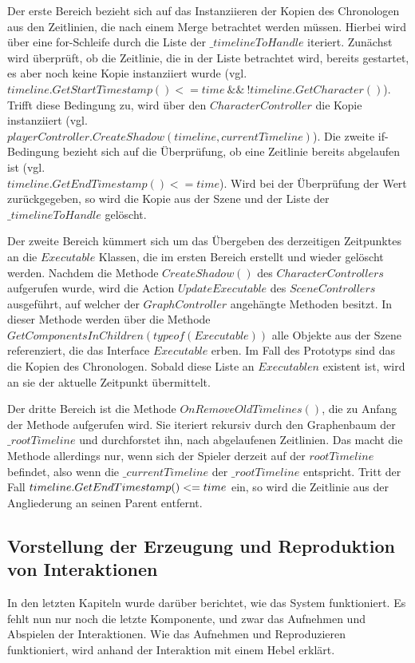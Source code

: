 Der erste Bereich bezieht sich auf das Instanziieren der Kopien des Chronologen aus den Zeitlinien, die nach einem Merge betrachtet werden müssen. Hierbei wird über eine for-Schleife durch die Liste der $\_timelineToHandle$ iteriert.
Zunächst wird überprüft, ob die Zeitlinie, die in der Liste betrachtet wird, bereits gestartet, es aber noch keine Kopie instanziiert wurde (vgl. $timeline.GetStartTimestamp() <= time ~\&\&~ !timeline.GetCharacter()$). Trifft diese Bedingung zu, wird über den $CharacterController$ die Kopie instanziiert (vgl.\\ $playerController.CreateShadow(timeline, currentTimeline)$). 
Die zweite if-Bedingung bezieht sich auf die Überprüfung, ob eine Zeitlinie bereits abgelaufen ist (vgl.\\$timeline.GetEndTimestamp() <= time$). Wird bei der Überprüfung der Wert  zurückgegeben, so wird die Kopie aus der Szene und der Liste der $\_timelineToHandle$ gelöscht.

Der zweite Bereich kümmert sich um das Übergeben des derzeitigen Zeitpunktes an die $Executable$ Klassen, die im ersten Bereich erstellt und wieder gelöscht werden. Nachdem die Methode $CreateShadow()$ des $CharacterControllers$ aufgerufen wurde, wird die Action $UpdateExecutable$ des $SceneControllers$ ausgeführt, auf welcher der $GraphController$ angehängte Methoden besitzt. In dieser Methode werden über die Methode $GetComponentsInChildren(typeof(Executable))$ alle Objekte aus der Szene referenziert, die das Interface $Executable$ erben. Im Fall des Prototyps sind das die Kopien des Chronologen. Sobald diese Liste an $Executablen$ existent ist, wird an sie der aktuelle Zeitpunkt übermittelt.

Der dritte Bereich ist die Methode $OnRemoveOldTimelines()$, die zu Anfang der Methode aufgerufen wird. Sie iteriert rekursiv durch den Graphenbaum der $\_rootTimeline$ und durchforstet ihn, nach abgelaufenen Zeitlinien. Das macht die Methode allerdings nur, wenn sich der Spieler derzeit auf der $rootTimeline$ befindet, also wenn die $\_currentTimeline$ der $\_rootTimeline$ entspricht. Tritt der Fall $\\timeline.GetEndTimestamp() <= time$ ein, so wird die Zeitlinie aus der Angliederung an seinen Parent entfernt.

\subsection{Vorstellung der Erzeugung und Reproduktion von Interaktionen}\label{sec:interactions_reproduction}
In den letzten Kapiteln wurde darüber berichtet, wie das System funktioniert. Es fehlt nun nur noch die letzte Komponente, und zwar das Aufnehmen und Abspielen der Interaktionen. Wie das Aufnehmen und Reproduzieren funktioniert, wird anhand der Interaktion mit einem Hebel erklärt.


